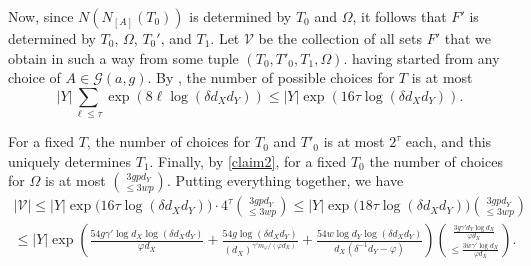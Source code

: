 \documentclass[a4paper]{amsart}
\theoremstyle{definition}
\newcommand{\0}[0]{\emptyset}
\begin{document}
Now, since $N(N_{[A]}(T_0))$ is determined by $T_0$ and $\Omega$, it follows that $F'$ is determined by $T_0$, $\Omega$, $T_0'$, and $T_1$. Let $\mathcal{V}$ be the collection of all sets $F'$ that we obtain in such a way from some tuple $(T_0, T'_0, T_1, \Omega)$. having started from any choice of $A\in \mathcal{G}(a,g)$. By , the number of possible choices for $T$ is at most
\[ |Y|\sum_{\ell\leq \tau} \exp(8\ell \log (\delta d_Xd_Y)) \leq |Y|\exp(16\tau\log (\delta d_Xd_Y)). \]

For a fixed $T$, the number of choices for $T_0$ and $T'_0$ is at most $2^{\tau}$ each, and this uniquely determines $T_1$. Finally, by \eqref{claim2}, for a fixed $T_0$ the number of choices for $\Omega$ is at most $\binom{3gpd_Y}{\leq 3wp}.$ Putting everything together, we have
\begin{align*}
    |\mathcal{V}| \leq |Y| \exp\big(16\tau\log (\delta d_Xd_Y)\big) \cdot 4^{\tau} \binom{3gpd_Y}{\leq 3wp} \leq |Y| \exp\big(18\tau\log (\delta d_Xd_Y)\big) \binom{3gpd_Y}{\leq 3wp} \\ \leq |Y| \exp\left( \frac{54g\gamma'\log d_X \log (\delta d_Xd_Y)}{\varphi d_X} + \frac{54g\log (\delta d_Xd_Y)}{(d_X)^{\gamma'm_\varphi/(\varphi d_X)}}+\frac{54w\log d_Y \log (\delta d_Xd_Y)}{d_X(\delta^{-1}d_Y-\varphi)} \right) \displaystyle\binom{\frac{3g\gamma'd_Y \log d_X}{\varphi d_X}}{\leq\frac{ 3w\gamma' \log d_X}{\varphi d_X}}.
\end{align*}
\newline
\end{document}
